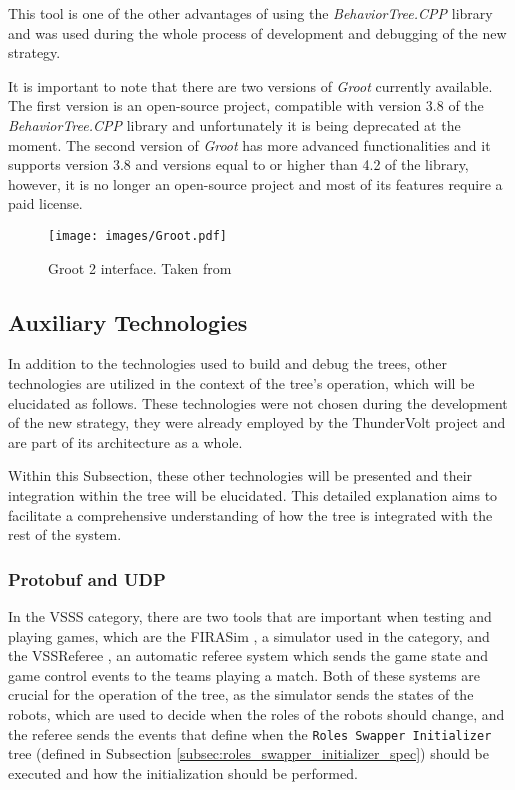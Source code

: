 This tool is one of the other advantages of using the \textit{BehaviorTree.CPP} library and was used during the whole process of development and debugging of the new strategy.

It is important to note that there are two versions of \textit{Groot} currently available. The first version is an open-source project, compatible with version 3.8 of the \textit{BehaviorTree.CPP} library and unfortunately it is being deprecated at the moment. The second version of \textit{Groot} has more advanced functionalities and it supports version 3.8 and versions equal to or higher than 4.2 of the library, however, it is no longer an open-source project and most of its features require a paid license.

\begin{figure}[h]
    \centering
    \texttt{[image: images/Groot.pdf]}
    \caption{Groot 2 interface. Taken from \cite{Groot}}
    \label{fig:groot}
\end{figure}

\subsection{Auxiliary Technologies}

In addition to the technologies used to build and debug the trees, other technologies are utilized in the context of the tree's operation, which will be elucidated as follows. These technologies were not chosen during the development of the new strategy, they were already employed by the ThunderVolt project and are part of its architecture as a whole.

Within this Subsection, these other technologies will be presented and their integration within the tree will be elucidated. This detailed explanation aims to facilitate a comprehensive understanding of how the tree is integrated with the rest of the system.

\subsubsection{Protobuf and UDP}

In the VSSS category, there are two tools that are important when testing and playing games, which are the FIRASim \cite{FIRASim}, a simulator used in the category, and the VSSReferee \cite{VSSReferee}, an automatic referee system which sends the game state and game control events to the teams playing a match. Both of these systems are crucial for the operation of the tree, as the simulator sends the states of the robots, which are used to decide when the roles of the robots should change, and the referee sends the events that define when the \texttt{Roles Swapper Initializer} tree (defined in Subsection \ref{subsec:roles_swapper_initializer_spec}) should be executed and how the initialization should be performed. 

